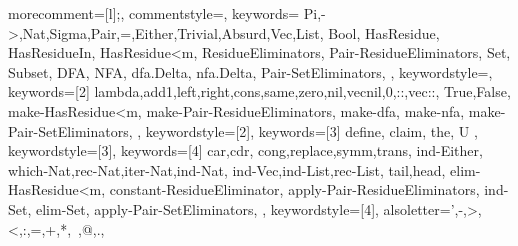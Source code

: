 
\newcommand\orange{\color[HTML]{f08c0a}}
\newcommand\lime{\color[HTML]{20b027}}

 {
	morecomment=[l]{;},
	commentstyle={\color[HTML]{7f7f7f}\slshape},
	keywords={
        Pi,->,Nat,Sigma,Pair,=,Either,Trivial,Absurd,Vec,List,
        Bool, HasResidue, HasResidueIn, HasResidue<m, ResidueEliminators, Pair-ResidueEliminators,
        Set, Subset, DFA, NFA, dfa.Delta, nfa.Delta,
        Pair-SetEliminators,
    },
    keywordstyle=\orange,
	keywords={[2]
        lambda,add1,left,right,cons,same,zero,nil,vecnil,0,::,vec::,
        True,False, make-HasResidue<m, make-Pair-ResidueEliminators,
        make-dfa, make-nfa,
        make-Pair-SetEliminators,
    },
    keywordstyle={[2]\lime},
    keywords={[3]
        define, claim, the, U
    },
    keywordstyle={[3]\color[HTML]{0000ff}},
    keywords={[4]
        car,cdr,
        cong,replace,symm,trans,
        ind-Either,
        which-Nat,rec-Nat,iter-Nat,ind-Nat,
        ind-Vec,ind-List,rec-List,
        tail,head,
        elim-HasResidue<m, constant-ResidueEliminator, apply-Pair-ResidueEliminators,
        ind-Set, elim-Set, apply-Pair-SetEliminators,
    },
    keywordstyle={[4]\color[HTML]{03a688}},
	alsoletter={',-,>,<,:,=,+,*,~,@,.},
}